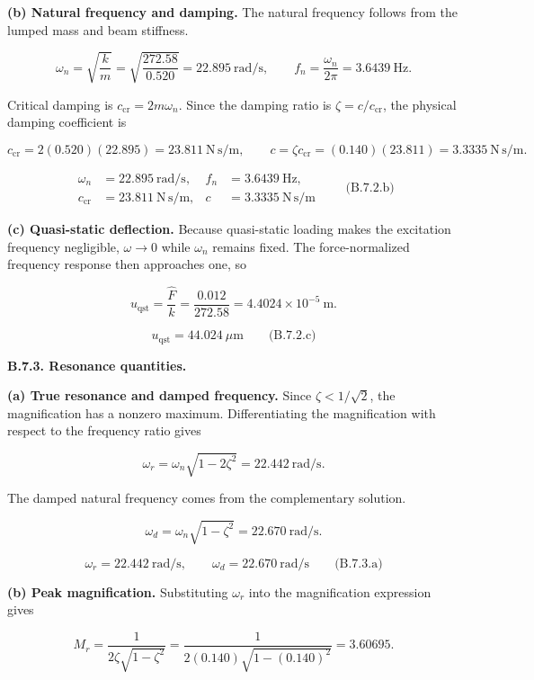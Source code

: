 \textbf{(b) Natural frequency and damping.} The natural frequency follows from the lumped mass and beam stiffness.

\[
\omega_n=\sqrt{\frac{k}{m}}
 =\sqrt{\frac{272.58}{0.520}}
 =22.895\ \mathrm{rad/s},
\qquad
f_n=\frac{\omega_n}{2\pi}=3.6439\ \mathrm{Hz}.
\]

Critical damping is $c_{\mathrm{cr}}=2m\omega_n$. Since the damping ratio is $\zeta=c/c_{\mathrm{cr}}$, the physical damping coefficient is

\[
c_{\mathrm{cr}}=2(0.520)(22.895)=23.811\ \mathrm{N\,s/m},
\qquad
c=\zeta c_{\mathrm{cr}}=(0.140)(23.811)=3.3335\ \mathrm{N\,s/m}.
\]

\[
\boxed{
\begin{aligned}
\omega_n&=22.895\ \mathrm{rad/s},&
f_n&=3.6439\ \mathrm{Hz},\\
c_{\mathrm{cr}}&=23.811\ \mathrm{N\,s/m},&
c&=3.3335\ \mathrm{N\,s/m}
\end{aligned}}
\qquad\text{(B.7.2.b)}
\]

\textbf{(c) Quasi-static deflection.} Because quasi-static loading makes the excitation frequency negligible, $\omega\to0$ while $\omega_n$ remains fixed. The force-normalized frequency response then approaches one, so

\[
u_{\mathrm{qst}}=\frac{\hat F}{k}
 =\frac{0.012}{272.58}
 =4.4024\times10^{-5}\ \mathrm{m}.
\]

\[
\boxed{u_{\mathrm{qst}}=44.024\ \mu\mathrm{m}}
\qquad\text{(B.7.2.c)}
\]

\textbf{B.7.3. Resonance quantities.}

\textbf{(a) True resonance and damped frequency.} Since $\zeta<1/\sqrt{2}$, the magnification has a nonzero maximum. Differentiating the magnification with respect to the frequency ratio gives

\[
\omega_r=\omega_n\sqrt{1-2\zeta^2}
 =22.442\ \mathrm{rad/s}.
\]

The damped natural frequency comes from the complementary solution.

\[
\omega_d=\omega_n\sqrt{1-\zeta^2}
 =22.670\ \mathrm{rad/s}.
\]

\[
\boxed{\omega_r=22.442\ \mathrm{rad/s},
\qquad
\omega_d=22.670\ \mathrm{rad/s}}
\qquad\text{(B.7.3.a)}
\]

\textbf{(b) Peak magnification.} Substituting $\omega_r$ into the magnification expression gives

\[
M_r=\frac{1}{2\zeta\sqrt{1-\zeta^2}}
 =\frac{1}{2(0.140)\sqrt{1-(0.140)^2}}
 =3.60695.
\]


